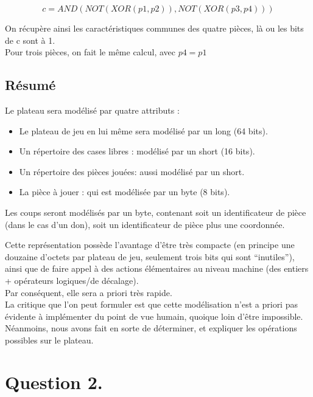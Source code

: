 \documentclass{article}
\begin{document}
\[ c = AND( NOT( XOR(p1, p2) ) , NOT( XOR(p3, p4) ) ) \]

On r\'ecup\`ere ainsi les caract\'eristiques 
communes des quatre pi\`eces, l\`a ou les bits de c sont \`a 1.\\

Pour trois pi\`eces, on fait le m\^eme calcul, avec \( p4 = p1 \)

\subsection{ R\'esum\'e }
\hypertarget{resume}{}
Le plateau sera mod\'elis\'e par quatre
attributs :

\begin{itemize}
\item Le plateau de jeu en lui m\^eme sera mod\'elis\'e par un long (64
  bits).
\item Un r\'epertoire des cases libres : mod\'elis\'e par un short (16 bits).
\item Un r\'epertoire des pi\`eces jou\'ees: aussi mod\'elis\'e par un short.
\item La pi\`ece \`a jouer : qui est mod\'elis\'ee par un byte (8 bits). %
\end{itemize}


Les coups seront mod\'elis\'es par un byte, contenant soit un
identificateur de pi\`ece (dans le cas d'un don), soit un identificateur
de pi\`ece plus une coordonn\'ee.


Cette repr\'esentation poss\`ede l'avantage d'\^etre tr\`es compacte (en
principe une douzaine d'octets par plateau de jeu,
seulement trois bits qui sont ``inutiles''), ainsi que de faire appel
\`a des actions \'el\'ementaires au niveau machine (des entiers + op\'erateurs
logiques/de d\'ecalage).\\

Par cons\'equent, elle sera a priori tr\`es rapide.\\
La critique que l'on peut formuler est que cette mod\'elisation
n'est a priori pas \'evidente \`a impl\'ementer du point de vue humain,
quoique loin d'\^etre impossible.\\


N\'eanmoins, nous avons fait en sorte de d\'eterminer, et expliquer les
op\'erations possibles sur le plateau.


\section{Question 2.}
\end{document}
